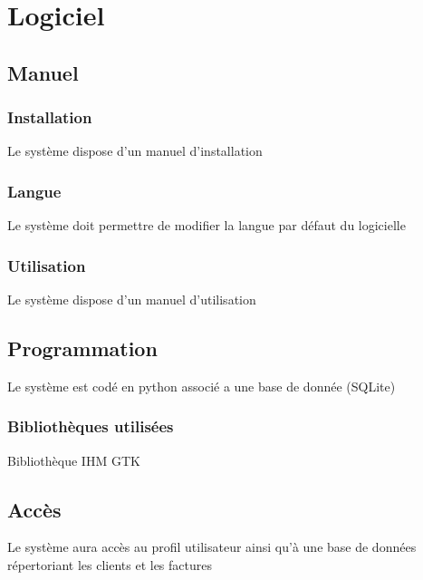 \documentclass{article}
\begin{document}
    
\section{Logiciel}
    \subsection{Manuel}
    \subsubsection{Installation}
    Le système dispose d'un manuel d'installation 
    \subsubsection{Langue}
    Le système doit permettre de modifier la langue par défaut du logicielle
    \subsubsection{Utilisation}
    Le système dispose d'un manuel d'utilisation
    \subsection{Programmation}
    Le système est codé en python associé a une base de donnée (SQLite)
    \subsubsection{Bibliothèques utilisées}
    Bibliothèque IHM GTK
    \subsection{Accès}
    Le système aura accès au profil utilisateur ainsi qu'à une base de données répertoriant les clients et les factures
    
\end{document}
